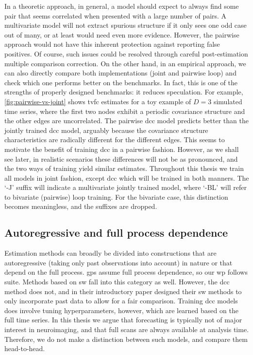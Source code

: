 In a theoretic approach, in general, a model should expect to always find some pair that seems correlated when presented with a large number of pairs.
A multivariate model will not extract spurious structure if it only sees one odd case out of many, or at least would need even more evidence.
However, the pairwise approach would not have this inherent protection against reporting false positives.
Of course, such issues could be resolved through careful post-estimation multiple comparison correction.
%
On the other hand, in an empirical approach, we can also directly compare both implementations (joint and pairwise loop) and check which one performs better on the benchmarks.
In fact, this is one of the strengths of properly designed benchmarks: it reduces speculation.
For example, \cref{fig:pairwise-vs-joint} shows \gls{tvfc} estimates for a toy example of $D = 3$ simulated time series, where the first two nodes exhibit a periodic covariance structure and the other edges are uncorrelated.
The pairwise \gls{dcc} model predicts better than the jointly trained \gls{dcc} model, arguably because the covariance structure characteristics are radically different for the different edges.
This seems to motivate the benefit of training \gls{dcc} in a pairwise fashion.
However, as we shall see later, in realistic scenarios these differences will not be as pronounced, and the two ways of training yield similar estimates.
%
Throughout this thesis we train all models in joint fashion, except \gls{dcc} which will be trained in both manners.
The `-J' suffix will indicate a multivariate jointly trained model, where `-BL' will refer to bivariate (pairwise) loop training.
For the bivariate case, this distinction becomes meaningless, and the suffixes are dropped.

\subsection{Autoregressive and full process dependence}

Estimation methods can broadly be divided into constructions that are autoregressive (taking only past observations into account) in nature or that depend on the full process.
%
\Glspl{gp} assume full process dependence, so our \gls{wp} follows suite.
Methods based on \gls{sw} fall into this category as well.
%
However, the \gls{dcc} method does not, and in their introductory paper \textcite{Lindquist2014} designed their \gls{sw} methods to only incorporate past data to allow for a fair comparison.
Training \gls{dcc} models does involve tuning hyperparameters, however, which are learned based on the full time series.
%
In this thesis we argue that forecasting is typically not of major interest in neuroimaging, and that full scans are always available at analysis time.
Therefore, we do not make a distinction between such models, and compare them head-to-head.

